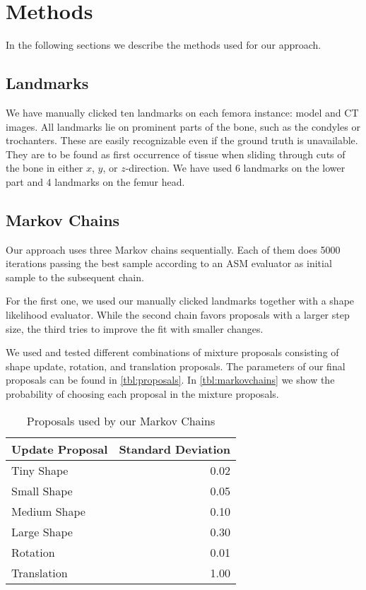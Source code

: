 \section{Methods}
\label{sec:methods}

In the following sections we describe the methods used for our approach.


\subsection{Landmarks}
\label{subsec:landmarks}

We have manually clicked ten landmarks on each femora instance: model and CT images.
All landmarks lie on prominent parts of the bone, such as the condyles or trochanters.
These are easily recognizable even if the ground truth is unavailable.
They are to be found as first occurrence of tissue when sliding through cuts of the bone in either $x$, $y$, or $z$-direction. 
We have used 6 landmarks on the lower part and 4 landmarks on the femur head.


\subsection{Markov Chains}
\label{subsec:markovchains}

Our approach uses three Markov chains sequentially. 
Each of them does 5000 iterations passing the best sample according to an ASM evaluator as initial sample to the subsequent chain.

For the first one, we used our manually clicked landmarks together with a shape likelihood evaluator.
While the second chain favors proposals with a larger step size, the third tries to improve the fit with smaller changes.

We used and tested different combinations of mixture proposals consisting of shape update, rotation, and translation proposals. 
The parameters of our final proposals can be found in \autoref{tbl:proposals}. 
In \autoref{tbl:markovchains} we show the probability of choosing each proposal in the mixture proposals.

\begin{table}
  \centering
  \caption{Proposals used by our Markov Chains}
  \label{tbl:proposals}
  \begin{tabular}{lr}
    \toprule
      \textbf{Update Proposal} &
      Standard Deviation \\
    \midrule
      Tiny Shape & 0.02 \\
      Small Shape & 0.05 \\
      Medium Shape & 0.10 \\
      Large Shape & 0.30 \\
      Rotation & 0.01 \\
      Translation & 1.00 \\
    \bottomrule
  \end{tabular}
\end{table}

